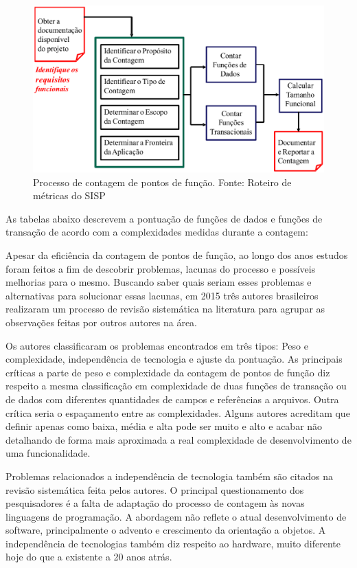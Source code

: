 \begin{figure}[h]
	\centering
	\label{fig01}
		\includegraphics[keepaspectratio=true,scale=0.4]{figuras/fig01.eps}
	\caption{Processo de contagem de pontos de função. Fonte: Roteiro de métricas do SISP}
\end{figure}


As tabelas abaixo descrevem a pontuação de funções de dados e funções de transação de acordo com a complexidades medidas durante a contagem:





Apesar da eficiência da contagem de pontos de função, ao longo dos anos estudos foram feitos a fim de descobrir problemas, lacunas do processo e possíveis melhorias para o mesmo. Buscando saber quais seriam esses problemas e alternativas para solucionar essas lacunas, em 2015 três autores brasileiros realizaram um processo de revisão sistemática na literatura para agrupar as observações feitas por outros autores na área.

Os autores classificaram os problemas encontrados em três tipos: Peso e complexidade, independência de tecnologia e ajuste da pontuação. As principais críticas a parte de peso e complexidade da contagem de pontos de função diz respeito a mesma classificação em complexidade de duas funções de transação ou de dados com diferentes quantidades de campos e referências a arquivos. Outra crítica seria o espaçamento entre as complexidades. Alguns autores acreditam que definir apenas como baixa, média e alta pode ser muito e alto e acabar não detalhando de forma mais aproximada a real complexidade de desenvolvimento de uma funcionalidade.

Problemas relacionados a independência de tecnologia também são citados na revisão sistemática feita pelos autores. O principal questionamento dos pesquisadores é a falta de adaptação do processo de contagem às novas linguagens de programação. A abordagem não reflete o atual desenvolvimento de software, principalmente o advento e crescimento da orientação a objetos. A independência de tecnologias também diz respeito ao hardware, muito diferente hoje do que a existente a 20 anos atrás.

